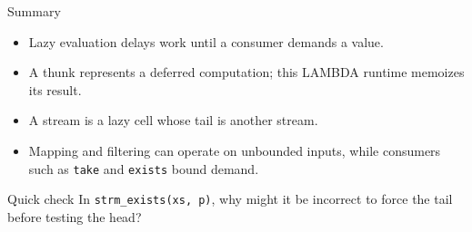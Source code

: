 \documentclass[aspectratio=169,10pt]{beamer}
\begin{document}
\begin{frame}{Summary}
  \begin{itemize}
    \item Lazy evaluation delays work until a consumer demands a value.
    \item A thunk represents a deferred computation; this LAMBDA runtime memoizes its result.
    \item A stream is a lazy cell whose tail is another stream.
    \item Mapping and filtering can operate on unbounded inputs, while consumers such as \texttt{take} and \texttt{exists} bound demand.
  \end{itemize}
  \vspace{0.7em}
  \begin{block}{Quick check}
    In \texttt{strm\_exists(xs, p)}, why might it be incorrect to force the
    tail before testing the head?
  \end{block}
\end{frame}
\end{document}
